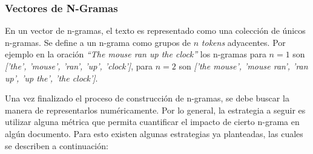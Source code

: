 \subsubsection{Vectores de N-Gramas}
    En un vector de n-gramas, el texto es representado como una colección de únicos n-gramas. Se define a un n-grama como grupos de $n$ \textit{tokens} adyacentes. Por ejemplo en la oración \textit{``The mouse ran up the clock''} los n-gramas para $n=1$ son \textit{['the', 'mouse', 'ran', 'up', 'clock']}, para $n=2$ son \textit{['the mouse', 'mouse ran', 'ran up', 'up the', 'the clock']}.
    
    Una vez finalizado el proceso de construcción de n-gramas, se debe buscar la manera de representarlos numéricamente. Por lo general, la estrategia a seguir es utilizar alguna métrica que permita cuantificar el impacto de cierto n-grama en algún documento. Para esto existen algunas estrategias ya planteadas, las cuales se describen a continuación:
